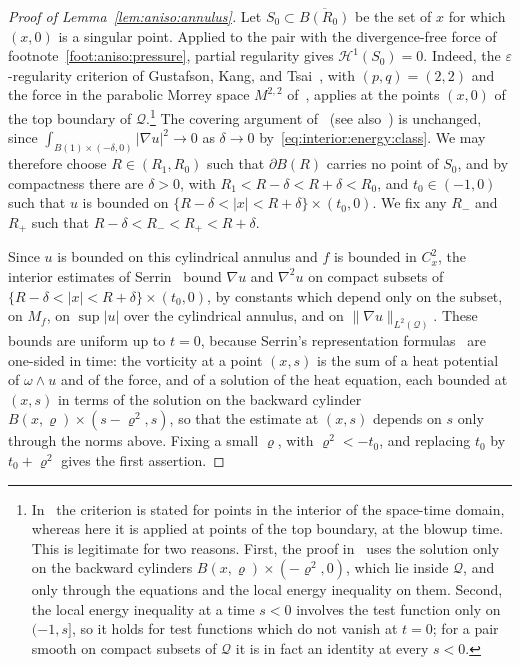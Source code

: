 \documentclass[11pt,reqno]{amsproc}
\numberwithin{equation}{section}
\theoremstyle{remark}
\newcommand{\eps}{\varepsilon}
\begin{document}
\begin{proof}[Proof of Lemma~\ref{lem:aniso:annulus}]
Let $S_0\subset\overline{B(R_0)}$ be the set of $x$ for which $(x,0)$ is a singular point. Applied to the pair with the divergence-free force of footnote~\ref{foot:aniso:pressure}, partial regularity gives $\mathcal H^1(S_0)=0$. Indeed, the $\eps$-regularity criterion of Gustafson, Kang, and Tsai~\cite[Theorem~1.1(ii)]{GKT07}, with $(p,q)=(2,2)$ and the force in the parabolic Morrey space $M^{2,2}$ of~\cite[Equation~(6)]{GKT07}, applies at the points $(x,0)$ of the top boundary of $\mathcal Q$.\footnote{In~\cite{GKT07} the criterion is stated for points in the interior of the space-time domain, whereas here it is applied at points of the top boundary, at the blowup time. This is legitimate for two reasons. First, the proof in~\cite{GKT07} uses the solution only on the backward cylinders $B(x,\varrho)\times(-\varrho^2,0)$, which lie inside $\mathcal Q$, and only through the equations and the local energy inequality on them. Second, the local energy inequality at a time $s<0$ involves the test function only on $(-1,s]$, so it holds for test functions which do not vanish at $t=0$; for a pair smooth on compact subsets of $\mathcal Q$ it is in fact an identity at every $s<0$.} The covering argument of~\cite{CKN} (see also~\cite{Lin98,LadyzhenskayaSeregin99,Kukavica08}) is unchanged, since $\int_{B(1)\times(-\delta,0)}|\nabla u|^2\to0$ as $\delta\to0$ by~\eqref{eq:interior:energy:class}. We may therefore choose $R\in(R_1,R_0)$ such that $\partial B(R)$ carries no point of $S_0$, and by compactness there are $\delta>0$, with $R_1<R-\delta<R+\delta<R_0$, and $t_0\in(-1,0)$ such that $u$ is bounded on $\{R-\delta<|x|<R+\delta\}\times(t_0,0)$. We fix any $R_-$ and $R_+$ such that $R-\delta<R_-<R_+<R+\delta$.

Since $u$ is bounded on this cylindrical annulus and $f$ is bounded in $C^2_x$, the interior estimates of Serrin~\cite[Section~4, with $m=1$]{Serrin62} bound $\nabla u$ and $\nabla^2u$ on compact subsets of $\{R-\delta<|x|<R+\delta\}\times(t_0,0)$, by constants which depend only on the subset, on $M_f$, on $\sup|u|$ over the cylindrical annulus, and on $\|\nabla u\|_{L^2(\mathcal Q)}$. These bounds are uniform up to $t=0$, because Serrin's representation formulas~\cite[Equation~(18), Equation~(20), and the display after Equation~(23)]{Serrin62} are one-sided in time: the vorticity at a point $(x,s)$ is the sum of a heat potential of $\omega\wedge u$ and of the force, and of a solution of the heat equation, each bounded at $(x,s)$ in terms of the solution on the backward cylinder $B(x,\varrho)\times(s-\varrho^2,s)$, so that the estimate at $(x,s)$ depends on $s$ only through the norms above. Fixing a small $\varrho$, with $\varrho^2<-t_0$, and replacing $t_0$ by $t_0+\varrho^2$ gives the first assertion.


\end{proof}
\end{document}
